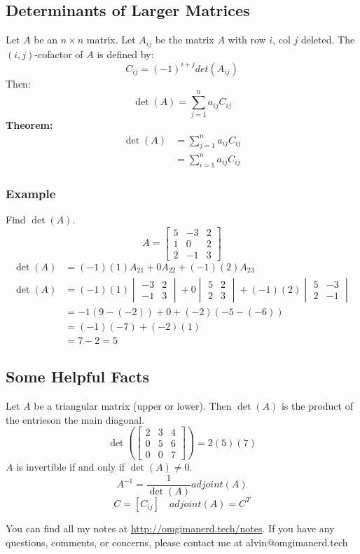 \documentclass[letterpaper, 12pt]{math}
\begin{document}
\subsection*{Determinants of Larger Matrices}
Let \( A \) be an \( n\times n \) matrix. Let \( A_{ij} \) be the matrix \( A \)
with row \( i \), col \( j \) deleted. The \( (i,j) \)-cofactor of \( A \) is
defined by:
\[ C_{ij} = (-1)^{i+j}det(A_{ij}) \]
Then:
\[ \det(A) = \sum_{j=1}^{n}a_{ij}C_{ij} \]
\textbf{Theorem:}
\begin{align*}
  \det(A) &= \sum_{j=1}^{n}a_{ij}C_{ij} \\
  &= \sum_{i=1}^{n}a_{ij}C_{ij}
\end{align*}

\subsubsection*{Example}
Find \( \det(A) \).
\[ A = \begin{bmatrix}5 & -3 & 2 \\ 1 & 0 & 2 \\ 2 & -1 & 3\end{bmatrix} \]
\begin{align*}
  \det(A) &= (-1)(1)A_{21}+0A_{22}+(-1)(2)A_{23} \\
  \det(A) &= (-1)(1)\begin{vmatrix}-3 & 2 \\ -1 & 3\end{vmatrix}+
    0\begin{vmatrix}5 & 2 \\ 2 & 3\end{vmatrix}+
    (-1)(2)\begin{vmatrix}5 & -3 \\ 2 & -1\end{vmatrix} \\
  &= -1(9-(-2))+0+(-2)(-5-(-6)) \\
  &= (-1)(-7)+(-2)(1) \\
  &= 7-2 = 5
\end{align*}

\subsection*{Some Helpful Facts}
Let \( A \) be a triangular matrix (upper or lower). Then \( \det(A) \) is
the product of the entrieson the main diagonal.
\[ \det\left(\begin{bmatrix}2 & 3 & 4 \\ 0 & 5 & 6 \\ 0 & 0 & 7
  \end{bmatrix}\right) = 2(5)(7) \]
\( A \) is invertible if and only if \( \det(A) \ne 0 \).
\[ A^{-1} = \frac{1}{\det(A)}adjoint(A) \]
\[ C = [C_{ij}] \quad adjoint(A) = C^T \]

\begin{center}
  You can find all my notes at \url{http://omgimanerd.tech/notes}. If you have
  any questions, comments, or concerns, please contact me at
  alvin@omgimanerd.tech
\end{center}
\end{document}
